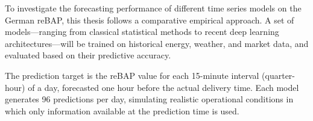 \documentclass[class=scrbook, crop=false]{standalone}
\begin{document}



To investigate the forecasting performance of different time series models on the German \gls{reBAP}, this thesis follows a comparative empirical approach. A set of models—ranging from classical statistical methods to recent deep learning architectures—will be trained on historical energy, weather, and market data, and evaluated based on their predictive accuracy.

The prediction target is the \gls{reBAP} value for each 15-minute interval (quarter-hour) of a day, forecasted one hour before the actual delivery time. Each model generates 96 predictions per day, simulating realistic operational conditions in which only information available at the prediction time is used.
\end{document}
